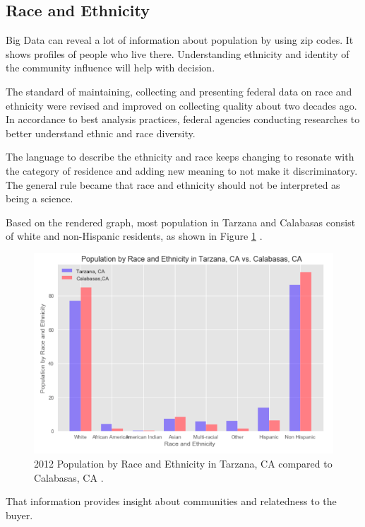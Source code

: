 \documentclass[sigconf]{acmart}
\begin{document}
\subsection{Race and Ethnicity}

Big Data can reveal a lot of information about population by using zip codes. It shows profiles of people who live there. 
Understanding ethnicity and identity of the community influence will help with decision.

The standard of maintaining, collecting and presenting federal data on race and ethnicity \cite{race} were revised and improved on collecting quality about two decades ago. In accordance to best analysis practices, federal agencies conducting researches to better understand ethnic and race diversity.

The language to describe the ethnicity and race keeps changing to resonate with the category of residence and adding new meaning to not make it discriminatory.  The general rule became that race and ethnicity should not be interpreted as being a science. 

Based on the rendered graph, most population in Tarzana and Calabasas consist of white and non-Hispanic residents, as shown in Figure \ref{fig:figure5} \cite{md}.

\begin{figure}
  \centering
  \includegraphics[width=1.0\columnwidth]{images/figure5.png}
  \caption{2012 Population by Race and Ethnicity in Tarzana, CA compared to Calabasas, CA \cite{md}.} \label{fig:figure5} 
\end{figure}

That information provides insight about communities and relatedness to the buyer.
\end{document}
